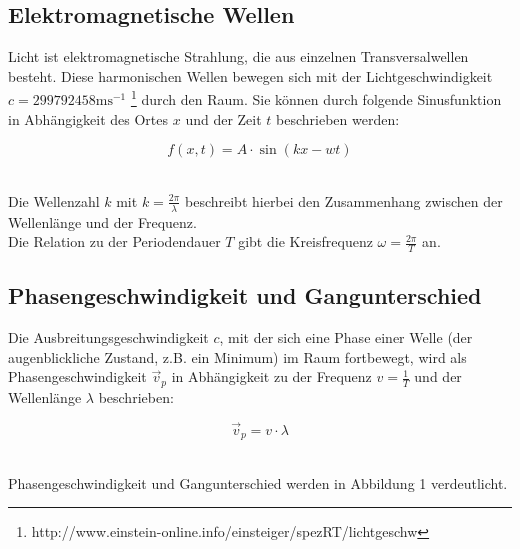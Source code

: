 \documentclass[12pt,a4paper,titlepage,headinclude,bibtotoc]{scrartcl}
\begin{document}
\subsection{Elektromagnetische Wellen}
Licht ist elektromagnetische Strahlung, die aus einzelnen Transversalwellen besteht. Diese harmonischen Wellen bewegen sich mit der Lichtgeschwindigkeit $c= 299 792 458\mathrm{ms^{-1}}$ \footnote{http://www.einstein-online.info/einsteiger/spezRT/lichtgeschw} durch den Raum. Sie können durch folgende Sinusfunktion in Abhängigkeit des Ortes $x$ und der Zeit $t$ beschrieben werden:
\\
\par %
\begin{equation}
f(x,t)={ A}\cdot{\sin(kx-wt)}
\end{equation}
\\
\par

Die Wellenzahl $k$ mit $k=\frac{2\pi}{\lambda}$ beschreibt hierbei den Zusammenhang zwischen der Wellenlänge und der Frequenz. \\
Die Relation zu der Periodendauer $T$ gibt die Kreisfrequenz $\omega =\frac{2\pi}{T} $ an.  



\subsection{Phasengeschwindigkeit und Gangunterschied}
Die Ausbreitungsgeschwindigkeit $c$, mit der sich eine Phase einer Welle (der augenblickliche Zustand, z.B. ein Minimum) im Raum fortbewegt, wird als Phasengeschwindigkeit $\vec{v}_p$ in Abhängigkeit zu der Frequenz $v=\frac{1}{T}$ und der Wellenlänge $\lambda$ beschrieben:\\
\par
\begin{equation}
\vec{v}_p = {v}\cdot{\lambda}
\end{equation}
\\
\par

Phasengeschwindigkeit und Gangunterschied werden in Abbildung 1 verdeutlicht.
\end{document}
